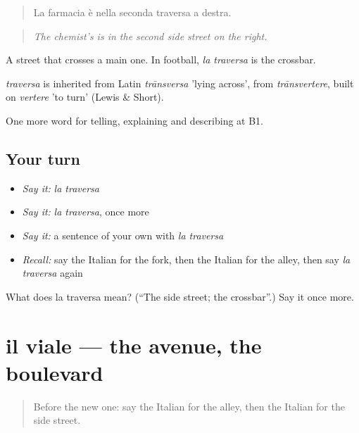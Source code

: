 \begin{quote}
La farmacia è nella seconda traversa a destra.
\end{quote}

\begin{quote}
\emph{The chemist's is in the second side street on the right.}
\end{quote}

A street that crosses a main one. In football, \emph{la traversa} is the crossbar.

\begin{cousinweb}
\emph{traversa} is inherited from Latin \emph{trānsversa} 'lying across', from \emph{trānsvertere}, built on \emph{vertere} 'to turn' (Lewis \& Short).
\end{cousinweb}

\begin{grammarlens}[title={What you've built}]
One more word for telling, explaining and describing at B1.
\end{grammarlens}

\subsection*{Your turn}
\begin{itemize}
\raggedright
  \item \emph{Say it:} \emph{la traversa}
  \item \emph{Say it:} \emph{la traversa}, once more
  \item \emph{Say it:} a sentence of your own with \emph{la traversa}
  \item \emph{Recall:} say the Italian for the fork, then the Italian for the alley, then say \emph{la traversa} again
\end{itemize}

\begin{tcolorbox}[breakable,colback=teal!4,colframe=teal!35!black,title={Before you move on}]
What does la traversa mean? (\textquotedblleft{}The side street; the crossbar\textquotedblright{}.) Say it once more.
\end{tcolorbox}
\section[il viale]{il viale — the avenue, the boulevard}

\label{lesson:IT-C441-viale}



\begin{quote}
Before the new one: say the Italian for the alley, then the Italian for the side street.
\end{quote}

